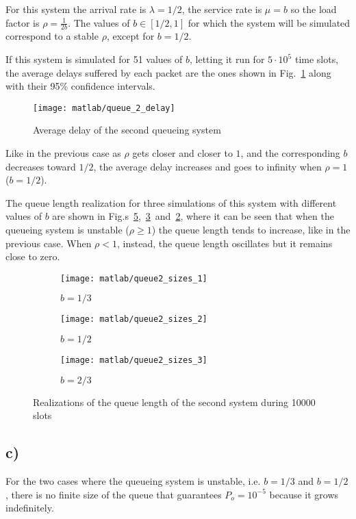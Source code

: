 \documentclass[a4paper,oneside]{article}
\begin{document}
For this system the arrival rate is $\lambda = 1/2$, the service rate
is $\mu = b$ so the load factor is $\rho = \frac{1}{2b}$. The values
of $b \in [1/2, 1]$ for which the system will be simulated correspond
to a stable $\rho$, except for $b=1/2$.

If this system is simulated for 51 values of $b$, letting it run for
$5 \cdot 10^5$ time slots, the average delays suffered by each packet
are the ones shown in Fig.~\ref{plot:queue2_delay} along with their
95\% confidence intervals.
\begin{figure}[htbp]
  \centering
    \texttt{[image: matlab/queue\_2\_delay]}
    \caption{Average delay of the second queueing system}
    \label{plot:queue2_delay}
\end{figure}
Like in the previous case as $\rho$ gets closer and closer to $1$, and
the corresponding $b$ decreases toward $1/2$, the average delay
increases and goes to infinity when $\rho = 1$ ($b = 1/2$).

The queue length realization for three simulations of this system with
different values of $b$ are shown in
Fig.s~\ref{plot:queue2_sizes_stable},~\ref{plot:queue2_sizes_limit}~and~\ref{plot:queue2_sizes_unstable},
where it can be seen that when the queueing system is unstable ($\rho
\geq 1$) the queue length tends to increase, like in the previous
case. When $\rho < 1$, instead, the queue length oscillates but it
remains close to zero.
\begin{figure}[htbp]
  \centering
  \begin{subfigure}{0.5\textwidth}
    \centering
    \texttt{[image: matlab/queue2\_sizes\_1]}
    \caption{$ b = 1/3 $}
    \label{plot:queue2_sizes_unstable}
  \end{subfigure}%
  \begin{subfigure}{0.5\textwidth}
    \centering
    \texttt{[image: matlab/queue2\_sizes\_2]}
    \caption{$ b = 1/2 $}
    \label{plot:queue2_sizes_limit}
  \end{subfigure}
  \begin{subfigure}{0.5\textwidth}
    \centering
    \texttt{[image: matlab/queue2\_sizes\_3]}
    \caption{$ b = 2/3 $}
    \label{plot:queue2_sizes_stable}
  \end{subfigure}
  \caption{Realizations of the queue length of the second system
    during 10000 slots}
\end{figure}

\subsection*{c)}
For the two cases where the queueing system is unstable, i.e. $b =
1/3$ and $b=1/2$, there is no finite size of the queue that guarantees
$P_o = 10^{-5}$ because it grows indefinitely.
\end{document}
